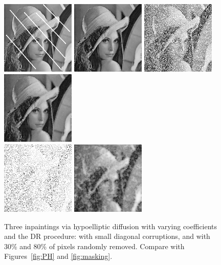 \documentclass[proc]{edpsmath}
\begin{document}
\begin{figure}
  \includegraphics[height=3.5cm]{imgs/lena-diag}
  \includegraphics[height = 3.5cm]{imgs/lena-varying}\qquad
  \includegraphics[height=3.5cm]{imgs/lena-random-30}
  \includegraphics[height = 3.5cm]{imgs/lena-random-30-varying}\\ \vspace{.5em}
    \includegraphics[height=3.5cm]{imgs/lena-random-80}
  \includegraphics[height = 3.5cm]{imgs/lena-random-80-varying}\qquad
  \caption{Three inpaintings via hypoelliptic diffusion with varying coefficients and the DR procedure: with small diagonal corruptions, and with 30\% and 80\% of pixels randomly removed. Compare with Figures~\ref{fig:PH} and \ref{fig:masking}.}
  \label{fig:varying}
\end{figure}
\end{document}
